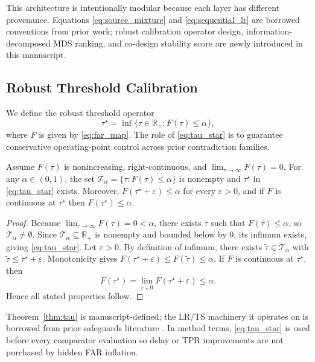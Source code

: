 This architecture is intentionally modular because each layer has different provenance. Equations \eqref{eq:source_mixture} and \eqref{eq:sequential_lr} are borrowed conventions from prior work; robust calibration operator design, information-decomposed MDS ranking, and co-design stability score are newly introduced in this manuscript.

\subsection{Robust Threshold Calibration}
We define the robust threshold operator
\begin{equation}
\tau^\star = \inf\{\tau\in\mathbb{R}_+: F(\tau)\le \alpha\},
\label{eq:tau_star}
\end{equation}
where $F$ is given by \eqref{eq:far_map}. The role of \eqref{eq:tau_star} is to guarantee conservative operating-point control across prior contradiction families.

\begin{theorem}\label{thm:tau}
Assume $F(\tau)$ is nonincreasing, right-continuous, and $\lim_{\tau\to\infty}F(\tau)=0$. For any $\alpha\in(0,1)$, the set $\mathcal{T}_\alpha=\{\tau:F(\tau)\le\alpha\}$ is nonempty and $\tau^\star$ in \eqref{eq:tau_star} exists. Moreover, $F(\tau^\star+\varepsilon)\le\alpha$ for every $\varepsilon>0$, and if $F$ is continuous at $\tau^\star$ then $F(\tau^\star)\le\alpha$.
\end{theorem}
\begin{proof}
Because $\lim_{\tau\to\infty}F(\tau)=0<\alpha$, there exists $\bar\tau$ such that $F(\bar\tau)\le\alpha$, so $\mathcal{T}_\alpha\neq\emptyset$. Since $\mathcal{T}_\alpha\subseteq\mathbb{R}_+$ is nonempty and bounded below by $0$, its infimum exists, giving \eqref{eq:tau_star}. Let $\varepsilon>0$. By definition of infimum, there exists $\tilde\tau\in\mathcal{T}_\alpha$ with $\tilde\tau\le\tau^\star+\varepsilon$. Monotonicity gives $F(\tau^\star+\varepsilon)\le F(\tilde\tau)\le\alpha$. If $F$ is continuous at $\tau^\star$, then
\[
F(\tau^\star)=\lim_{\varepsilon\downarrow 0}F(\tau^\star+\varepsilon)\le\alpha.
\]
Hence all stated properties follow.
\end{proof}

Theorem~\ref{thm:tau} is manuscript-defined; the LR/TS machinery it operates on is borrowed from prior safeguards literature \citep{SRC009,SRC017,SRC023}. In method terms, \eqref{eq:tau_star} is used before every comparator evaluation so delay or TPR improvements are not purchased by hidden FAR inflation.

